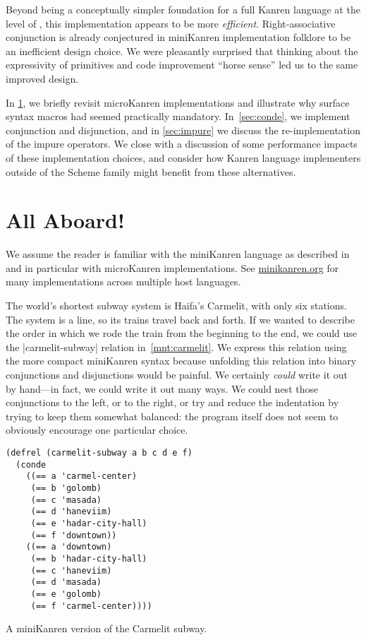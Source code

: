 \documentclass[sigplan,screen,draft,anonymous,review,natbib=false]{acmart}
\begin{document}
Beyond being a conceptually simpler foundation for a full Kanren
language at the level of , this
implementation appears to be more \emph{efficient}. Right-associative
conjunction is already conjectured in miniKanren implementation
folklore to be an inefficient design choice. We were pleasantly
surprised that thinking about the expressivity of primitives and code
improvement \enquote{horse sense} led us to the same improved design.

In \cref{sec:all-aboard}, we briefly revisit microKanren
implementations and illustrate why surface syntax macros had seemed
practically mandatory. In~\cref{sec:conde}, we implement conjunction
and disjunction, and in \cref{sec:impure} we discuss the
re-implementation of the impure operators. We close with a discussion
of some performance impacts of these implementation choices, and
consider how Kanren language implementers outside of the Scheme family
might benefit from these alternatives.

\section{All Aboard!}\label{sec:all-aboard}

We assume the reader is familiar with the miniKanren language as
described in  and in particular with
microKanren implementations. See \href{minikanren.org}{minikanren.org}
for many implementations across multiple host languages.

The world's shortest subway system is Haifa's Carmelit, with only
six stations. The system is a line, so its trains travel back and
forth. If we wanted to describe the order in which we rode the train
from the beginning to the end, we could use the
\rackinline|carmelit-subway| relation in~\cref{mnt:carmelit}. We
express this relation using the more compact miniKanren syntax because
unfolding this relation into binary conjunctions and disjunctions
would be painful. We certainly \emph{could} write it out by hand---in
fact, we could write it out many ways. We could nest those
conjunctions to the left, or to the right, or try and reduce the
indentation by trying to keep them somewhat balanced: the program
itself does not seem to obviously encourage one particular choice.

\begin{listing}
  \begin{verbatim}
(defrel (carmelit-subway a b c d e f)
  (conde
    ((== a 'carmel-center)
     (== b 'golomb)
     (== c 'masada)
     (== d 'haneviim)
     (== e 'hadar-city-hall)
     (== f 'downtown))
    ((== a 'downtown)
     (== b 'hadar-city-hall)
     (== c 'haneviim)
     (== d 'masada)
     (== e 'golomb)
     (== f 'carmel-center))))
  \end{verbatim}
  \caption{A miniKanren version of the Carmelit subway.}
  \label{mnt:carmelit}
\end{listing}
\end{document}

